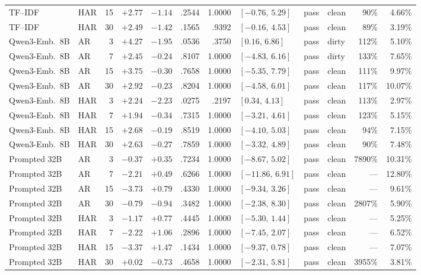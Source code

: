 \begin{table}[p]
\begin{tabular}{@{}llrrrrrlllrr@{}}
TF--IDF & HAR & 15 & $+2.77$ & $-1.14$ & .2544 & 1.0000 & $[-0.76,\,5.29]$ & pass & clean & 90\% & 4.66\% \\
TF--IDF & HAR & 30 & $+2.49$ & $-1.42$ & .1565 & .9392 & $[-0.16,\,4.53]$ & pass & clean & 89\% & 3.19\% \\
\addlinespace
Qwen3-Emb.\ 8B & AR & 3 & $+4.27$ & $-1.95$ & .0536 & .3750 & $[0.16,\,6.86]$ & pass & dirty & 112\% & 5.10\% \\
Qwen3-Emb.\ 8B & AR & 7 & $+2.45$ & $-0.24$ & .8107 & 1.0000 & $[-4.83,\,6.16]$ & pass & dirty & 133\% & 7.65\% \\
Qwen3-Emb.\ 8B & AR & 15 & $+3.75$ & $-0.30$ & .7658 & 1.0000 & $[-5.35,\,7.79]$ & pass & clean & 111\% & 9.97\% \\
Qwen3-Emb.\ 8B & AR & 30 & $+2.92$ & $-0.23$ & .8204 & 1.0000 & $[-4.58,\,6.01]$ & pass & clean & 117\% & 10.07\% \\
\addlinespace
Qwen3-Emb.\ 8B & HAR & 3 & $+2.24$ & $-2.23$ & .0275 & .2197 & $[0.34,\,4.13]$ & pass & clean & 113\% & 2.97\% \\
Qwen3-Emb.\ 8B & HAR & 7 & $+1.94$ & $-0.34$ & .7315 & 1.0000 & $[-3.21,\,4.61]$ & pass & clean & 123\% & 5.15\% \\
Qwen3-Emb.\ 8B & HAR & 15 & $+2.68$ & $-0.19$ & .8519 & 1.0000 & $[-4.10,\,5.03]$ & pass & clean & 94\% & 7.15\% \\
Qwen3-Emb.\ 8B & HAR & 30 & $+2.63$ & $-0.27$ & .7859 & 1.0000 & $[-3.32,\,4.89]$ & pass & clean & 90\% & 7.48\% \\
\addlinespace
Prompted 32B & AR & 3 & $-0.37$ & $+0.35$ & .7234 & 1.0000 & $[-8.67,\,5.02]$ & pass & clean & 7890\% & 10.31\% \\
Prompted 32B & AR & 7 & $-2.21$ & $+0.49$ & .6266 & 1.0000 & $[-11.86,\,6.91]$ & pass & clean & --- & 12.80\% \\
Prompted 32B & AR & 15 & $-3.73$ & $+0.79$ & .4330 & 1.0000 & $[-9.34,\,3.26]$ & pass & clean & --- & 9.61\% \\
Prompted 32B & AR & 30 & $-0.79$ & $-0.94$ & .3482 & 1.0000 & $[-2.38,\,8.30]$ & pass & clean & 2807\% & 5.90\% \\
\addlinespace
Prompted 32B & HAR & 3 & $-1.17$ & $+0.77$ & .4445 & 1.0000 & $[-5.30,\,1.44]$ & pass & clean & --- & 5.25\% \\
Prompted 32B & HAR & 7 & $-2.22$ & $+1.06$ & .2896 & 1.0000 & $[-7.45,\,2.07]$ & pass & clean & --- & 6.52\% \\
Prompted 32B & HAR & 15 & $-3.37$ & $+1.47$ & .1434 & 1.0000 & $[-9.37,\,0.78]$ & pass & clean & --- & 7.07\% \\
Prompted 32B & HAR & 30 & $+0.02$ & $-0.73$ & .4658 & 1.0000 & $[-2.31,\,5.81]$ & pass & clean & 3955\% & 3.81\% \\
\bottomrule
\end{tabular}
\end{table}

